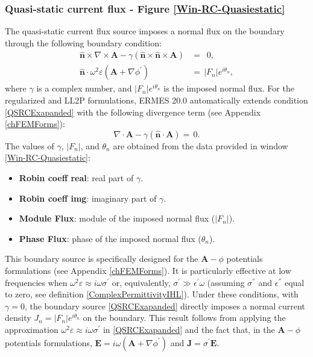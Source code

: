 \subsubsection{Quasi-static current flux - Figure \ref{Win-RC-Quasiestatic}}\label{bsRCQuasiStatic}

The quasi-static current flux source imposes a normal flux on the boundary through the following boundary condition: 
\begin{equation}\label{QSRCExapanded}
	\begin{aligned}
		\mathbf{\hat{n}}\times\nabla\times\mathbf{A} - \gamma(\mathbf{\hat{n}}\times\mathbf{\hat{n}}\times\mathbf{A}) &= \,\,\,0,
		\\
		\mathbf{\hat{n}}\cdot\omega^{2}\varepsilon\left(\mathbf{A} + \nabla\phi^{'}\right) &= \,|F_{n}|e^{i\theta_{n}},
	\end{aligned}
\end{equation}
where $\gamma$ is a complex number, and $|F_{n}|e^{i\theta_{n}}$ is the imposed normal flux. For the regularized and LL2P formulations, ERMES 20.0 automatically extends condition \eqref{QSRCExapanded} with the following divergence term (see Appendix \ref{chFEMForms}):
\begin{equation}
	\nabla\cdot\mathbf{A} - \gamma\left(\mathbf{\hat{n}}\cdot\mathbf{A}\right) = \,0.	
\end{equation}
The values of $\gamma$, $|F_{n}|$, and $\theta_{n}$ are obtained from the data provided in window \ref{Win-RC-Quasiestatic}:
\begin{itemize}\itemsep0em 
	\item \textbf{Robin coeff real}: real part of $\gamma$. 
	\item \textbf{Robin coeff  img}: imaginary part of $\gamma$. 
	\item \textbf{Module Flux}: module of the imposed normal flux ($|F_{n}|$).
	\item \textbf{Phase Flux}: phase of the imposed normal flux ($\theta_{n}$).
\end{itemize}
This boundary source is specifically designed for the $\textbf{A}-\phi$ potentials formulations (see Appendix \ref{chFEMForms}). It is particularly effective at low frequencies when $\omega^{2}\varepsilon \approx i\omega\sigma^{'}$ or, equivalently, $\sigma^{'} \gg \epsilon^{'}\omega$ (assuming $\sigma^{''}$ and $\epsilon^{''}$ equal to zero, see definition \eqref{ComplexPermittivityIHL}). Under these conditions, with $\gamma = 0$, the boundary source \eqref{QSRCExapanded} directly imposes a normal current density $J_{n} = |F_{n}|e^{i\theta_{n}}$ on the boundary. This result follows from applying the approximation $\omega^{2}\varepsilon \approx i\omega\sigma^{'}$ in \eqref{QSRCExapanded} and the fact that, in the $\textbf{A}-\phi$ potentials formulations, $\mathbf{E} = i\omega(\mathbf{A} + \nabla\phi^{'})$ and $\mathbf{J} = \sigma^{'}\mathbf{E}$. 

